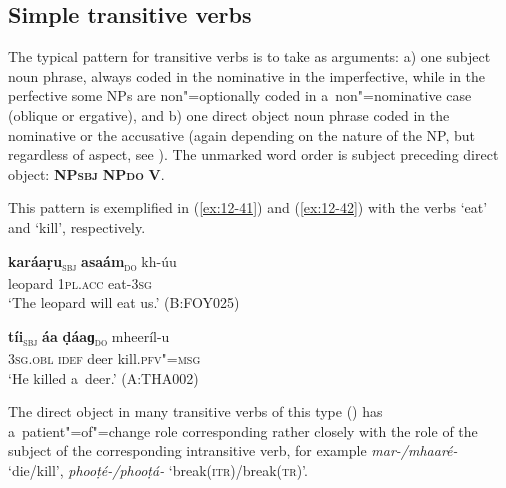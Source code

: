 \subsection{Simple transitive verbs}
\label{subsec:12-2-3}


The typical pattern for transitive verbs is to take as arguments: a) one subject noun phrase, always coded in the nominative in the imperfective, while in the perfective some NPs are non"=optionally coded in a~non"=nominative case (oblique or ergative), and b) one direct object noun phrase coded in the nominative or the accusative (again depending on the nature of the NP, but regardless of aspect, see ). The unmarked word order is subject preceding direct object: \textbf{NP\textsc{sbj}} \textbf{NP\textsc{do}} \textbf{V}.


This pattern is exemplified in (\ref{ex:12-41}) and (\ref{ex:12-42}) with the verbs `eat' and `kill', respectively.

\begin{exe}
\ex
\label{ex:12-41}
\gll {\ob}\textbf{karáaṛu}{\cb}\textsubscript{\textsc{\upshape sbj}} {\ob}\textbf{asaám}{\cb}\textsubscript{\textsc{\upshape do}} kh-úu \\
leopard \textsc{1pl.acc} eat-\textsc{3sg} \\
\glt `The leopard will eat us.' (B:FOY025)
\end{exe}
\begin{exe}
\ex
\label{ex:12-42}
\gll {\ob}\textbf{tíi}{\cb}\textsubscript{\textsc{\upshape sbj}} {\ob}\textbf{áa} \textbf{ḍáaɡ}{\cb}\textsubscript{\textsc{\upshape do}} mheeríl-u \\
\textsc{3sg.obl} \textsc{idef} deer kill.\textsc{pfv"=msg} \\
\glt `He killed a~deer.' (A:THA002)
\end{exe}

The direct object in many transitive verbs of this type () has a~patient"=of"=change role corresponding rather closely with the role of the subject of the corresponding intransitive verb, for example \textit{mar-/mhaaré-} `die/kill', \textit{phooṭé-/phooṭá-} `break(\textsc{itr})/break(\textsc{tr})'.



